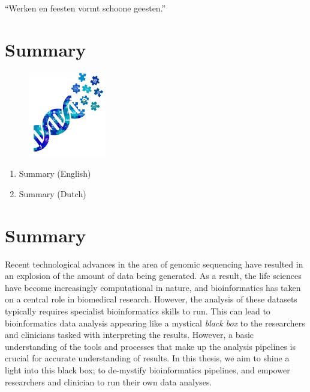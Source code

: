 \begin{savequote}[75mm]
``Werken en feesten vormt schoone geesten.''
\end{savequote}

\chapter{Summary}\label{chapter:summary}
\setcounter{figure}{-1}
\setcounter{table}{-1}
\setcounter{section}{-1}
\setcounter{NAT@ctr}{-1}

\begin{figure}[t!]
\includegraphics[height=10em]{frontmatter/images/samenvatting.png}
\end{figure}

\begin{enumerate}[label=\ref{chapter:summary}.\arabic*]
\itemsep-0.5em
\item Summary (English)
\item Summary (Dutch)
\end{enumerate}


\chapter*{Summary}

Recent technological advances in the area of genomic sequencing have resulted in an explosion of the amount of data being generated. As a result, the life sciences have become increasingly computational in nature, and bioinformatics has taken on a central role in biomedical research. However, the analysis of these datasets typically requires specialist bioinformatics skills to run. This can lead to bioinformatics data analysis appearing like a mystical \textit{black box} to the researchers and clinicians tasked with interpreting the results. However, a basic understanding of the tools and processes that make up the analysis pipelines is crucial for accurate understanding of results. In this thesis, we aim to shine a light into this black box; to de-mystify bioinformatics pipelines, and empower researchers and clinician to run their own data analyses.

